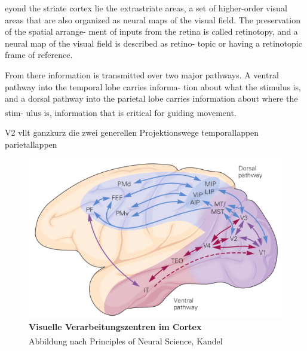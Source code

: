 \documentclass[12pt,a4paper,pdftex]{article}
\begin{document}
eyond the striate
cortex lie the extrastriate areas, a set of higher-order
visual areas that are also organized as neural maps of
the visual field. The preservation of the spatial arrange-
ment of inputs from the retina is called retinotopy, and
a neural map of the visual field is described as retino-
topic or having a retinotopic frame of reference.

From there
information is transmitted over two major pathways.
A ventral pathway into the temporal lobe carries informa-
tion about what the stimulus is, and a dorsal pathway into
the parietal lobe carries information about where the stim-
ulus is, information that is critical for guiding movement.
\textsuperscript{\cite[25]{kandel2013principles}}

V2
vllt ganzkurz die zwei generellen Projektionswege
    temporallappen
    parietallappen
    
\begin{figure}[H]
    \centering
    \includegraphics{pictures/visual/visual_Cortex.png}
    \caption[Visuelle Verarbeitungszentren im Cortex]{\textbf{Visuelle Verarbeitungszentren im Cortex}\\
    Abbildung nach Principles of Neural Science, Kandel \textsuperscript{\cite[27]{kandel2013principles}}}
    \label{fig:visual_pathway_cortex}
\end{figure}
\end{document}
